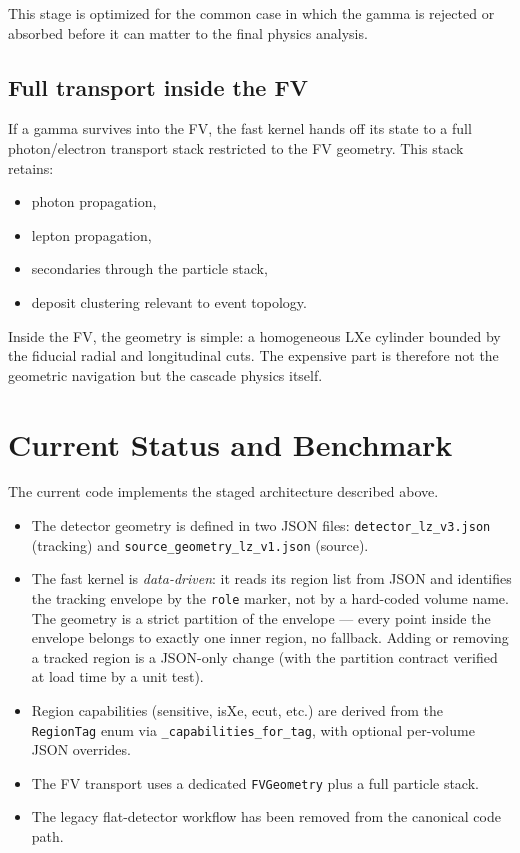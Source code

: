 \documentclass[11pt]{article}
\begin{document}
This stage is optimized for the common case in which the gamma is rejected or
absorbed before it can matter to the final physics analysis.

\subsection{Full transport inside the FV}

If a gamma survives into the FV, the fast kernel hands off its state to a
full photon/electron transport stack restricted to the FV geometry. This stack
retains:

\begin{itemize}
\item photon propagation,
\item lepton propagation,
\item secondaries through the particle stack,
\item deposit clustering relevant to event topology.
\end{itemize}

Inside the FV, the geometry is simple: a homogeneous LXe cylinder bounded by the
fiducial radial and longitudinal cuts. The expensive part is therefore not the
geometric navigation but the cascade physics itself.

\section{Current Status and Benchmark}

The current code implements the staged architecture described above.

\begin{itemize}
\item The detector geometry is defined in two JSON files:
  \texttt{detector\_lz\_v3.json} (tracking) and
  \texttt{source\_geometry\_lz\_v1.json} (source).
\item The fast kernel is \emph{data-driven}: it reads its region list from
  JSON and identifies the tracking envelope by the \texttt{role} marker,
  not by a hard-coded volume name. The geometry is a strict partition of
  the envelope --- every point inside the envelope belongs to exactly
  one inner region, no fallback. Adding or removing a tracked region
  is a JSON-only change (with the partition contract verified at load
  time by a unit test).
\item Region capabilities (sensitive, isXe, ecut, etc.) are derived from the
  \texttt{RegionTag} enum via \texttt{\_capabilities\_for\_tag}, with optional
  per-volume JSON overrides.
\item The FV transport uses a dedicated \texttt{FVGeometry} plus a full
particle stack.
\item The legacy flat-detector workflow has been removed from the canonical
code path.
\end{itemize}
\end{document}
